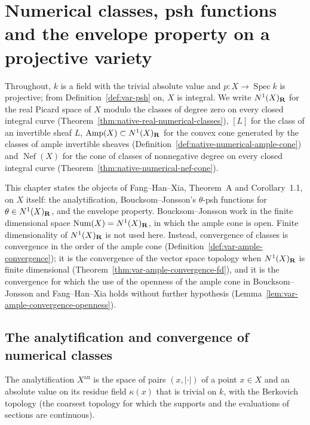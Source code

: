 \section{Numerical classes, psh functions and the envelope property on a projective variety}
\label{sec:source-numerical-psh}

Throughout, $k$ is a field with the trivial absolute value and $p:X\to\operatorname{Spec}k$ is
projective; from Definition~\ref{def:var-psh} on, $X$ is integral. We write $N^1(X)_{\mathbf{R}}$ for the
real Picard space of $X$ modulo the classes of degree zero on every closed integral curve
(Theorem~\ref{thm:native-real-numerical-classes}), $[L]$ for the class of an invertible sheaf
$L$, $\operatorname{Amp}(X)\subset N^1(X)_{\mathbf{R}}$ for the convex cone generated by the classes of
ample invertible sheaves (Definition~\ref{def:native-numerical-ample-cone}) and
$\operatorname{Nef}(X)$ for the cone of classes of nonnegative degree on every closed integral
curve (Theorem~\ref{thm:native-numerical-nef-cone}).

This chapter states the objects of Fang--Han--Xia, Theorem~A and Corollary~1.1, on $X$
itself: the analytification, Boucksom--Jonsson's $\theta$-psh functions for
$\theta\in N^1(X)_{\mathbf{R}}$, and the envelope property. Boucksom--Jonsson work in the finite
dimensional space $\operatorname{Num}(X)=N^1(X)_{\mathbf{R}}$, in which the ample cone is open. Finite
dimensionality of $N^1(X)_{\mathbf{R}}$ is not used here. Instead, convergence of classes is convergence
in the order of the ample cone (Definition~\ref{def:var-ample-convergence}); it is the
convergence of the vector space topology when $N^1(X)_{\mathbf{R}}$ is finite dimensional
(Theorem~\ref{thm:var-ample-convergence-fd}), and it is the convergence for which the use of
the openness of the ample cone in Boucksom--Jonsson and Fang--Han--Xia holds without further
hypothesis (Lemma~\ref{lem:var-ample-convergence-openness}).

\subsection{The analytification and convergence of numerical classes}

\begin{definition}
\label{def:var-analytification}
\leanok
{}
The analytification $X^{\mathrm{an}}$ is the space of pairs $(x,|\cdot|)$ of a point $x\in X$
and an absolute value on its residue field $\kappa(x)$ that is trivial on $k$, with the
Berkovich topology (the coarsest topology for which the supports and the evaluations of
sections are continuous).
\end{definition}

